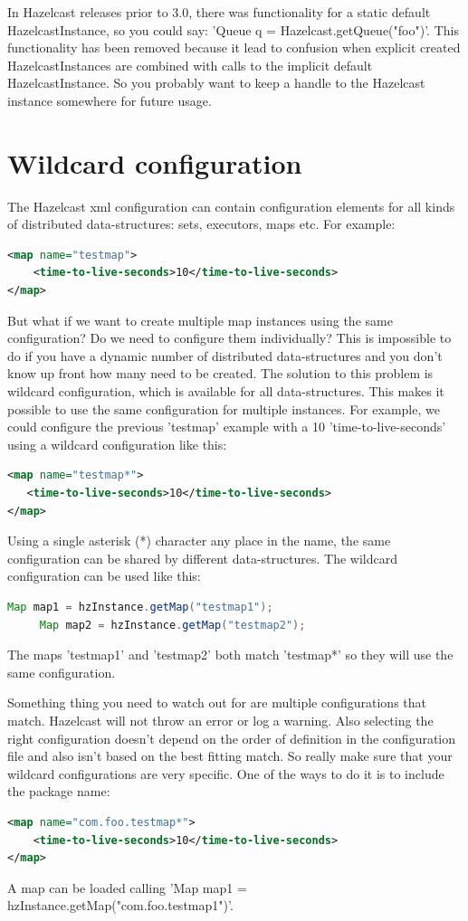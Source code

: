 In Hazelcast releases prior to 3.0, there was functionality for a static default HazelcastInstance, so you could say: 'Queue q = Hazelcast.getQueue("foo")'. This functionality has been removed because it lead to confusion when explicit created HazelcastInstances are combined with calls to the implicit default HazelcastInstance. So you probably want to keep a handle to the Hazelcast instance somewhere for future usage.

\section{Wildcard configuration}
The Hazelcast xml configuration can contain configuration elements for all kinds of distributed data-structures: sets, executors, maps etc. For example:
\begin{lstlisting}[language=xml]
<map name="testmap">
    <time-to-live-seconds>10</time-to-live-seconds>
</map>
\end{lstlisting}
But what if we want to create multiple map instances using the same configuration? Do we need to configure them individually? This is impossible to do if you have a dynamic number of distributed data-structures and you don't know up front how many need to be created. The solution to this problem is wildcard configuration, which is available for all data-structures. This makes it possible to use the same configuration for multiple instances. For example, we could configure the previous 'testmap' example with a 10 'time-to-live-seconds' using a wildcard configuration like this:
\begin{lstlisting}[language=xml]
<map name="testmap*">
   <time-to-live-seconds>10</time-to-live-seconds>
</map>
\end{lstlisting}
Using a single asterisk (*) character any place in the name, the same configuration can be shared by different  data-structures. The wildcard configuration can be used like this:
\begin{lstlisting}[language=java]
     Map map1 = hzInstance.getMap("testmap1");
     Map map2 = hzInstance.getMap("testmap2");
\end{lstlisting}
The maps 'testmap1' and 'testmap2' both match 'testmap*' so they will use the same configuration.

Something thing you need to watch out for are multiple configurations that match. Hazelcast will not throw an error or log a warning. Also selecting the right configuration doesn't depend on the order of definition in the configuration file and also isn't based on the best fitting match. So really make sure that your wildcard configurations are very specific. One of the ways to do it is to include the package name:
\begin{lstlisting}[language=xml]
<map name="com.foo.testmap*">
    <time-to-live-seconds>10</time-to-live-seconds>
</map>
\end{lstlisting}
A map can be loaded calling 'Map map1 = hzInstance.getMap("com.foo.testmap1")'. 

